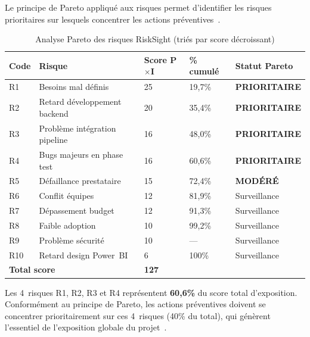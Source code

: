 \documentclass[12pt, a4paper]{report}
\begin{document}
Le principe de Pareto appliqué aux risques permet d'identifier les risques
prioritaires sur lesquels concentrer les actions préventives~\cite{cours_gp}.

\begin{table}[H]
\centering
\caption{Analyse Pareto des risques RiskSight (triés par score décroissant)}
\label{tab:pareto}
\renewcommand{\arraystretch}{1.3}
\begin{tabularx}{\textwidth}{p{0.7cm} X p{1.5cm} p{2cm} p{3cm}}
\toprule
\rowcolor{primary!12}
Code & Risque & Score P$\times$I & \% cumulé & Statut Pareto \\
\midrule
R1  & Besoins mal définis               & 25 & 19,7\%  & \textcolor{dangercolor}{\textbf{PRIORITAIRE}} \\
R2  & Retard développement backend      & 20 & 35,4\%  & \textcolor{dangercolor}{\textbf{PRIORITAIRE}} \\
R3  & Problème intégration pipeline     & 16 & 48,0\%  & \textcolor{dangercolor}{\textbf{PRIORITAIRE}} \\
R4  & Bugs majeurs en phase test        & 16 & 60,6\%  & \textcolor{dangercolor}{\textbf{PRIORITAIRE}} \\
R5  & Défaillance prestataire           & 15 & 72,4\%  & \textcolor{secondary}{\textbf{MODÉRÉ}} \\
R6  & Conflit équipes                   & 12 & 81,9\%  & \textcolor{secondary}{Surveillance} \\
R7  & Dépassement budget                & 12 & 91,3\%  & Surveillance \\
R8  & Faible adoption                   & 10 & 99,2\%  & Surveillance \\
R9  & Problème sécurité                 & 10 & --- & Surveillance \\
R10 & Retard design Power~BI            & 6  & 100\%   & Surveillance \\
\midrule
\multicolumn{2}{l}{\textbf{Total score}} & \textbf{127} & & \\
\bottomrule
\end{tabularx}
\end{table}

\begin{tcolorbox}[successbox,title={Conclusion de l'analyse Pareto}]
Les 4~risques R1, R2, R3 et R4 représentent \textbf{60,6\%} du score total d'exposition.
Conformément au principe de Pareto, les actions préventives doivent se concentrer
prioritairement sur ces 4~risques (40\% du total), qui génèrent l'essentiel de
l'exposition globale du projet~\cite{cours_gp}.
\end{tcolorbox}
\end{document}
